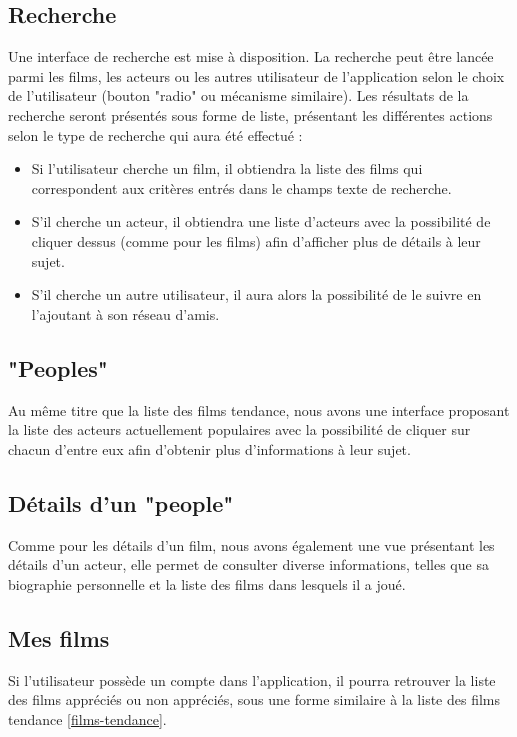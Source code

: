 \subsection{Recherche}
Une interface de recherche est mise à disposition. La recherche peut être lancée parmi les films, les acteurs ou les autres utilisateur de l'application selon le choix de l'utilisateur (bouton "radio" ou mécanisme similaire).
Les résultats de la recherche seront présentés sous forme de liste, présentant les différentes actions selon le type de recherche qui aura été effectué :
\begin{itemize}
    \item Si l'utilisateur cherche un film, il obtiendra la liste des films qui correspondent aux critères entrés dans le champs texte de recherche.
    \item S'il cherche un acteur, il obtiendra une liste d'acteurs avec la possibilité de cliquer dessus (comme pour les films) afin d'afficher plus de détails à leur sujet.
    \item S'il cherche un autre utilisateur, il aura alors la possibilité de le suivre en l'ajoutant à son réseau d'amis.
\end{itemize}


\subsection{"Peoples"}
Au même titre que la liste des films tendance, nous avons une interface proposant la liste des acteurs actuellement populaires avec la possibilité de cliquer sur chacun d'entre eux afin d'obtenir plus d'informations à leur sujet.


\subsection{Détails d'un "people"}
Comme pour les détails d'un film, nous avons également une vue présentant les détails d'un acteur, elle permet de consulter diverse informations, telles que sa biographie personnelle et la liste des films dans lesquels il a joué.


\subsection{Mes films}\label{mes-films}
Si l'utilisateur possède un compte dans l'application, il pourra retrouver la liste des films appréciés ou non appréciés, sous une forme similaire à la liste des films tendance \ref{films-tendance}.

